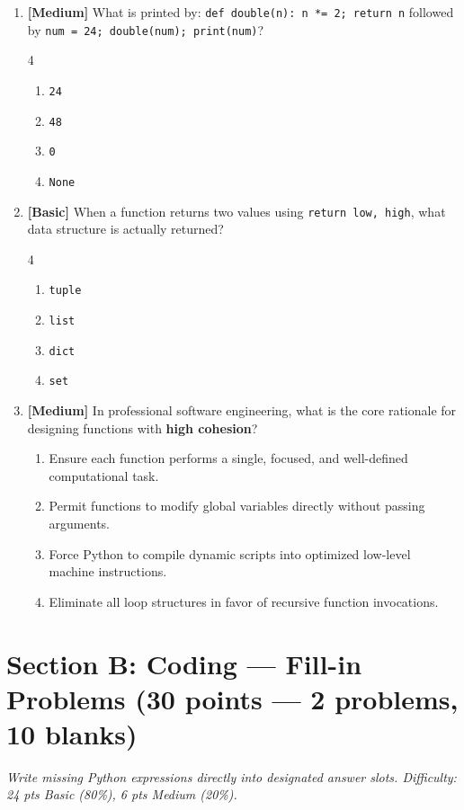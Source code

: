 \documentclass[11pt,a4paper]{article}
\begin{document}
\begin{enumerate}[label=\textbf{Q\arabic*.},leftmargin=1.8em,itemsep=0.7pt,topsep=0.3pt,resume]
\item \textbf{[Medium]} What is printed by: \texttt{def double(n): n *= 2; return n} followed by \texttt{num = 24; double(num); print(num)}?
\begin{multicols}{4}
\begin{enumerate}[label=\Alph*.]
  \item \texttt{24}
  \item \texttt{48}
  \item \texttt{0}
  \item \texttt{None}
\end{enumerate}
\end{multicols}

\item \textbf{[Basic]} When a function returns two values using \texttt{return low, high}, what data structure is actually returned?
\begin{multicols}{4}
\begin{enumerate}[label=\Alph*.]
  \item \texttt{tuple}
  \item \texttt{list}
  \item \texttt{dict}
  \item \texttt{set}
\end{enumerate}
\end{multicols}

\item \textbf{[Medium]} In professional software engineering, what is the core rationale for designing functions with \textbf{high cohesion}?
\begin{enumerate}[label=\Alph*.,leftmargin=1.8em]
  \item Ensure each function performs a single, focused, and well-defined computational task.
  \item Permit functions to modify global variables directly without passing arguments.
  \item Force Python to compile dynamic scripts into optimized low-level machine instructions.
  \item Eliminate all loop structures in favor of recursive function invocations.
\end{enumerate}

\end{enumerate}

\vspace{-1.5mm}
\section*{Section B: Coding --- Fill-in Problems \hfill \normalsize\normalfont(30 points --- 2 problems, 10 blanks)}
\textit{Write missing Python expressions directly into designated answer slots. Difficulty: 24 pts Basic (80\%), 6 pts Medium (20\%).}
\end{document}
